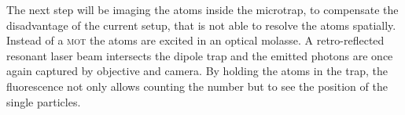 The next step will be imaging the atoms inside the microtrap, to compensate the disadvantage of the current setup, that is not able to resolve the atoms spatially. Instead of a \textsc{mot} the atoms are excited in an optical molasse. A retro-reflected resonant laser beam intersects the dipole trap and the emitted photons are once again captured by objective and camera. By holding the atoms in the trap, the fluorescence not only allows counting the number but to see the position of the single particles.



